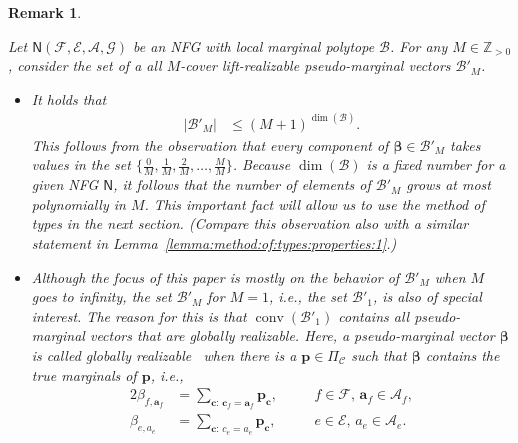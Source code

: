 \documentclass[journal, twocolumn]{IEEEtran}
\renewcommand{\mathbf}[1]{{\bm{#1}}}
\newcommand{\ie}{\emph{i.e.}}
\renewcommand{\leq}{\leqslant}
\newcommand{\Z}{\mathbb{Z}}
\newcommand{\Zpp}{\Z_{>0}}
\newcommand{\vect}[1]{\mathbf{#1}}
\newcommand{\code}[1]{\mathcal{#1}}
\newcommand{\set}[1]{\mathcal{#1}}
\newcommand{\graph}[1]{\mathsf{#1}}
\newcommand{\codeCedge}{\code{C}}
\newcommand{\bel}{\beta}
\newcommand{\vbel}{\boldsymbol{\bel}}
\newcommand{\setA}{\set{A}}
\newcommand{\setE}{\set{E}}
\newcommand{\setF}{\set{F}}
\newcommand{\setG}{\set{G}}
\newcommand{\va}{\vect{a}}
\newcommand{\vc}{\vect{c}}
\newcommand{\vp}{\vect{p}}
\newcommand{\lmpB}{\mathcal{B}}
\newcommand{\lmpBdown}[1]{\mathcal{B}'_{#1}}
\newcommand{\graphN}{\graph{N}}
\newcommand{\convhull}{\operatorname{conv}}
\newcommand{\card}[1]{\left\lvert #1 \right\rvert}
\newcommand{\?}{\mathrm{?}}
\newcommand{\setPi}{\Pi}
\newtheorem{Remark}[Lemma]{Remark}
\begin{document}
\begin{Remark}
  \label{remark:lmpB:1}

  Let $\graphN(\setF,\setE, \setA, \setG)$ be an NFG with local marginal
  polytope $\lmpB$. For any $M \in \Zpp$, consider the set of a all $M$-cover
  lift-realizable pseudo-marginal vectors $\lmpBdown{M}$.

  \begin{itemize}
  
  \item It holds that
    \begin{align*}
      \card{\lmpBdown{M}}
        &\leq (M + 1)^{\operatorname{dim}(\lmpB)}.
    \end{align*}
    This follows from the observation that every component of $\vbel \in
    \lmpBdown{M}$ takes values in the set $\bigl\{ \frac{0}{M}, \frac{1}{M},
    \frac{2}{M}, \ldots, \frac{M}{M} \bigr\}$. Because
    $\operatorname{dim}(\lmpB)$ is a fixed number for a given NFG $\graphN$,
    it follows that the number of elements of $\lmpBdown{M}$ grows at most
    polynomially in $M$. This important fact will allow us to use the method
    of types in the next section. (Compare this observation also with a
    similar statement in Lemma~\ref{lemma:method:of:types:properties:1}.)
  
  \item Although the focus of this paper is mostly on the behavior of
    $\lmpBdown{M}$ when $M$ goes to infinity, the set $\lmpBdown{M}$ for $M = 1$, \ie,
    the set $\lmpBdown{1}$, is also of special interest. The reason for this is
    that $\convhull(\lmpBdown{1})$ contains all pseudo-marginal vectors that are
    globally realizable. Here, a pseudo-marginal vector $\vbel$ is called
    globally realizable~\cite{Wainwright:Jordan:08:1} when there is a $\vp \in
    \setPi_{\codeCedge}$ such that $\vbel$ contains the true marginals of
    $\vp$, \ie,
    \begin{alignat*}{2}
      \bel_{f,\va_f}
        &= \sum_{\vc: \, \vc_f = \va_f}
             \vp_{\vc},
               \quad && f \in \setF, \, \va_f \in \setA_f, \\
      \bel_{e,a_e}
        &= \sum_{\vc: \, c_e = a_e}
             \vp_{\vc},
               \quad && e \in \setE, \, a_e \in \setA_e.
    \end{alignat*}


\end{itemize}
\end{Remark}
\end{document}
